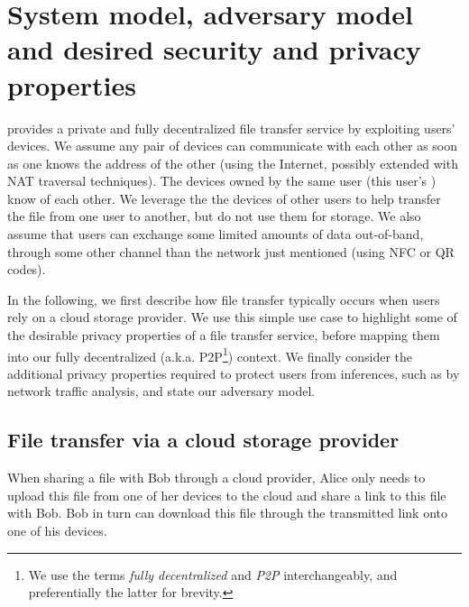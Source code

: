 

\section{System model, adversary model and desired security and privacy properties}%
\label{system-model}

\name provides a private and fully decentralized file transfer service by exploiting 
users' devices.  We assume any pair of devices can communicate with each other as soon as one knows the address of the other (\eg using the
Internet, possibly extended with NAT traversal techniques). The
devices owned by the same user (this user's \squad) know of each
other. We leverage the the devices of other users to help transfer the file from one user
to another, but do not use them for storage.  We also assume that users
can exchange some limited amounts of data out-of-band, \ie through
some other channel than the network just mentioned (\eg using \ac{NFC}
or QR codes).



In the following, we first describe how file transfer typically occurs
when users rely on a cloud storage provider. We use this simple use
case to highlight some of the desirable privacy properties of a file
transfer service, before mapping them into our fully decentralized
(a.k.a. P2P\footnote{We use the terms \emph{fully decentralized} and
  \emph{P2P} interchangeably, and preferentially the latter for brevity.})
context.  We finally consider the additional privacy properties
required to protect users from inferences, such as by network traffic
analysis, and state our adversary model.

\subsection{File transfer via a cloud storage provider}

When sharing a file with Bob through a cloud provider, Alice only
needs to upload this file from one of her devices to the cloud and
share a link to this file with Bob. Bob in turn can download this file
through the transmitted link onto one of his devices.

